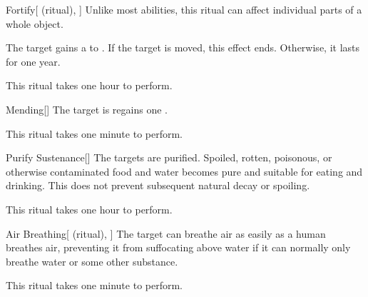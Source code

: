 \lowercase{\hypertarget{spell:Fortify}{}}\label{spell:Fortify}
\begin{attuneability}[Rank 1]{\hypertarget{spell:Fortify}{Fortify}}[ (ritual), ]
Unlike most abilities, this ritual can affect individual parts of a whole object.

The target gains a   to .
If the target is moved, this effect ends.
Otherwise, it lasts for one year.

This ritual takes one hour to perform.
\end{attuneability}
\vspace{0.25em}



\lowercase{\hypertarget{spell:Mending}{}}\label{spell:Mending}
\begin{apability}[Rank 1]{\hypertarget{spell:Mending}{Mending}}[]
The target is regains one .

This ritual takes one minute to perform.
\end{apability}
\vspace{0.25em}



\lowercase{\hypertarget{spell:Purify Sustenance}{}}\label{spell:Purify Sustenance}
\begin{apability}[Rank 1]{\hypertarget{spell:Purify Sustenance}{Purify Sustenance}}[]
The targets are purified.
Spoiled, rotten, poisonous, or otherwise contaminated food and water becomes pure and suitable for eating and drinking.
This does not prevent subsequent natural decay or spoiling.

This ritual takes one hour to perform.
\end{apability}
\vspace{0.25em}



\lowercase{\hypertarget{spell:Air Breathing}{}}\label{spell:Air Breathing}
\begin{attuneability}[Rank 3]{\hypertarget{spell:Air Breathing}{Air Breathing}}[ (ritual), ]
The target can breathe air as easily as a human breathes air, preventing it from suffocating above water if it can normally only breathe water or some other substance.

This ritual takes one minute to perform.
\end{attuneability}
\vspace{0.25em}



